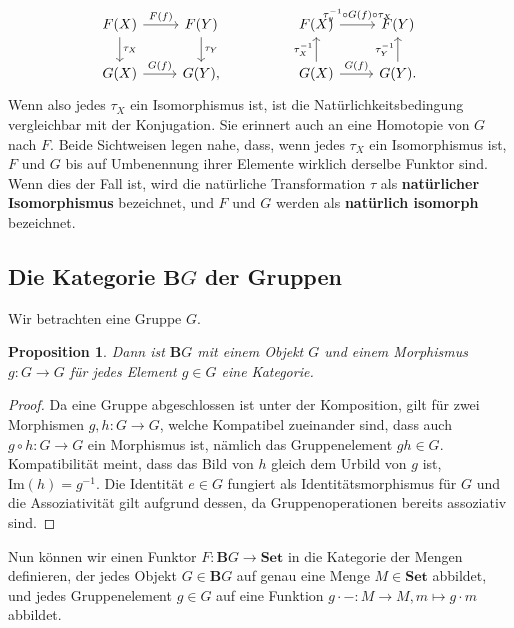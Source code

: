 \documentclass{article}
\theoremstyle{plain}
\newtheorem{prop}[thm]{Proposition}
\theoremstyle{definition}
\theoremstyle{remark}
\begin{document}
\begin{enumerate}
\begin{equation}
\begin{tikzcd}
		F(X) \arrow[r, "F(f)"] \arrow[d, "\tau_X"] & F(Y) \arrow[d, "\tau_Y"] &  & F(X) \arrow[r, "\tau_y^{-1} \circ G(f) \circ \tau_X"] & F(Y)                           \\
		G(X) \arrow[r, "G(f)"]                     & {G(Y),}                  &  & G(X) \arrow[u, "\tau_X^{-1}"] \arrow[r, "G(f)"]       & G(Y). \arrow[u, "\tau_Y^{-1}"]
		\end{tikzcd}
	\end{equation}
	Wenn also jedes $\tau_X$ ein Isomorphismus ist, ist die Natürlichkeitsbedingung vergleichbar mit der Konjugation. Sie erinnert auch an eine Homotopie von $G$ nach $F$. Beide Sichtweisen legen nahe, dass, wenn jedes $\tau_X$ ein Isomorphismus ist, $F$ und $G$ bis auf Umbenennung ihrer Elemente wirklich derselbe Funktor sind. Wenn dies der Fall ist, wird die natürliche Transformation $\tau$ als \textbf{natürlicher Isomorphismus} bezeichnet, und $F$ und $G$ werden als \textbf{natürlich isomorph} bezeichnet.
\end{enumerate}

\subsection{Die Kategorie $\textbf{B}G$ der Gruppen}
Wir betrachten eine Gruppe $G$.

\begin{prop}
Dann ist $\textbf{B}G$ mit einem Objekt $G$ und einem Morphismus $g: G \rightarrow G$ für jedes Element $g \in G$ eine Kategorie.
\end{prop}

\begin{proof} Da eine Gruppe abgeschlossen ist unter der Komposition, gilt für zwei Morphismen $g,h: G \rightarrow G$, welche Kompatibel zueinander sind, dass auch $g \circ h : G \rightarrow G$ ein Morphismus ist, nämlich das Gruppenelement $gh \in G$. Kompatibilität meint, dass das Bild von $h$ gleich dem Urbild von $g$ ist, $\text{Im}(h) = g^{-1}$. Die Identität $e \in G$ fungiert als Identitätsmorphismus für $G$ und die Assoziativität gilt aufgrund dessen, da Gruppenoperationen bereits assoziativ sind.
\end{proof}

Nun können wir einen Funktor $F: \textbf{B}G \rightarrow \textbf{Set}$ in die Kategorie der Mengen definieren, der jedes Objekt $G \in \textbf{B}G$ auf genau eine Menge $M \in \textbf{Set}$ abbildet, und jedes Gruppenelement $g \in G$ auf eine Funktion $g \cdot - : M \rightarrow M, m \mapsto g \cdot m$ abbildet.
\end{document}
